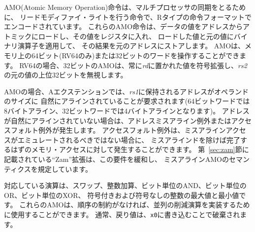 AMO(Atomic Memory Operation)命令は、マルチプロセッサの同期をとるために、
リードモディファイ・ライトを行う命令で、Rタイプの命令フォーマットでエンコードされています。 
これらのAMO命令は、データの値をアドレスからアトミックにロードし、その値をレジスタに入れ、
ロードした値と元の値にバイナリ演算子を適用して、
その結果を元のアドレスにストアします。
AMOは、メモリ上の64ビット(RV64のみ)または32ビットのワードを操作することができます。
RV64の場合、32ビットのAMOは、常に{\em rd}に置かれた値を符号拡張し、{\em rs2}の元の値の上位32ビットを無視します。

\begin{comment}
For AMOs, the A extension requires that the address held in {\em rs1}
be naturally aligned to the size of the operand (i.e., eight-byte
aligned for 64-bit words and four-byte aligned for 32-bit words).  If
the address is not naturally aligned, an address-misaligned exception
or an access-fault exception will be generated.  The access-fault exception can be
generated for a memory access that would otherwise be able to complete
except for the misalignment, if the misaligned access should not be
emulated.  The ``Zam'' extension, described in Chapter~\ref{sec:zam},
relaxes this requirement and specifies the semantics of misaligned
AMOs.
\end{comment}

AMOの場合、Aエクステンションでは、{\em rs1}に保持されるアドレスがオペランドのサイズに
自然にアラインされていることが要求されます(64ビットワードでは8バイトアライン、32ビットワードでは4バイトアラインとなります)。
アドレスが自然にアラインされていない場合は、アドレスミスアライン例外またはアクセスフォルト例外が発生します。
アクセスフォルト例外は、ミスアラインアクセスがエミュレートされるべきではない場合に、
ミスアラインドを除けば完了するはずのメモリ・アクセスに対して発生することができます。
第~\ref{sec:zam}節に記載されている``Zam''拡張は、この要件を緩和し、
ミスアラインAMOのセマンティクスを規定しています。

\begin{comment}
The operations supported are swap, integer add, bitwise AND, bitwise
OR, bitwise XOR, and signed and unsigned integer maximum and minimum.
Without ordering constraints, these AMOs can be used to implement
parallel reduction operations, where typically the return value would
be discarded by writing to {\tt x0}.
\end{comment}

対応している演算は、スワップ、整数加算、ビット単位のAND、ビット単位のOR、ビット単位のXOR、
符号付きおよび符号なしの整数の最大値と最小値です。
これらのAMOは、順序の制約がなければ、並列の削減演算を実装するために使用することができます。
通常、戻り値は、{\tt x0}に書き込むことで破棄されます。

